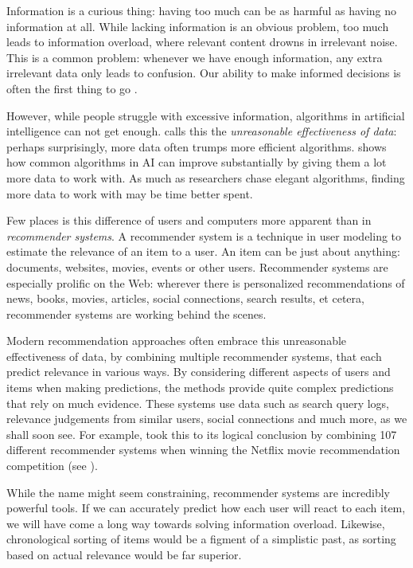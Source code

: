 \label{chap:intro}

Information is a curious thing:
having too much can be as harmful as having no information at all.
While lacking information is an obvious problem,
too much leads to information overload,
where relevant content drowns in irrelevant noise.
This is a common problem: whenever we have enough information,
any extra irrelevant data only leads to confusion.
Our ability to make informed decisions is often the first thing to go
\cite[p1]{Davenport2001}.

However, while people struggle with excessive information,
algorithms in artificial intelligence can not get enough.
\citet[p1]{Halevy2009} calls this the \emph{unreasonable effectiveness of data}:
perhaps surprisingly, more data often trumps more efficient algorithms.
\citet[p3]{Banko2001} shows how common algorithms in AI can improve substantially by giving them a lot more data to work with.
As much as researchers chase elegant algorithms, finding more data to work with may be time better spent.

Few places is this difference of users and computers more apparent than in \emph{recommender systems}.
A recommender system is a technique in user modeling to estimate the relevance of an item to a user.
An item can be just about anything: documents, websites, movies, events or other users.
Recommender systems are especially prolific on the Web: 
wherever there is personalized recommendations of news, books, movies,
articles, social connections, search results, et cetera, recommender systems are working behind the scenes.

Modern recommendation approaches often embrace this unreasonable effectiveness of data,
by combining multiple recommender systems, that each predict relevance in various ways.
By considering different aspects of users and items when making predictions,
the methods provide quite complex predictions that rely on much evidence.
These systems use data such as search query logs, relevance judgements from similar users,
social connections and much more, as we shall soon see.
For example, \citet[p1]{Bell2007} took this to its logical conclusion by 
combining 107 different recommender systems when winning the Netflix movie recommendation competition
(see \citet{Linden2009}).

While the name might seem constraining, recommender systems are incredibly powerful tools.
If we can accurately predict how each user will react to each item,
we will have come a long way towards solving information overload.
Likewise, chronological sorting of items would be a figment of a simplistic past,
as sorting based on actual relevance would be far superior.

